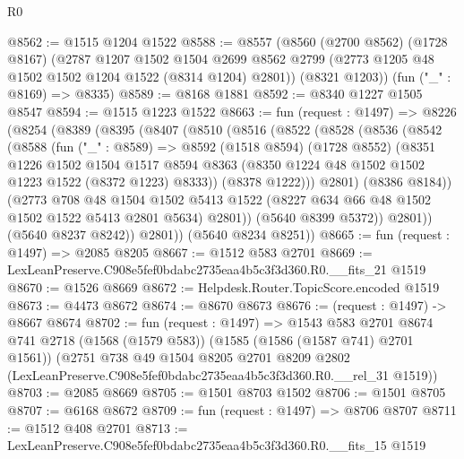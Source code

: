 \begin{lexlean}{R0}
\begin{coremodule}
@8562 := @1515 @1204 @1522
@8588 := @8557
    (@8560
      (@2700 @8562)
      (@1728 @8167)
      (@2787
        @1207
        @1502
        @1504
        @2699
        @8562
        @2799
        (@2773 @1205 @48 @1502 @1502 @1204 @1522 (@8314 @1204) @2801))
      (@8321 @1203))
    (fun ("_" : @8169) => @8335)
@8589 := @8168 @1881
@8592 := @8340 @1227 @1505 @8547
@8594 := @1515 @1223 @1522
@8663 := fun (request : @1497) =>
  @8226
    (@8254
      (@8389
        (@8395
          (@8407
            (@8510
              (@8516
                (@8522
                  (@8528
                    (@8536
                      (@8542
                        (@8588
                          (fun ("_" : @8589) =>
                          @8592
                            (@1518 @8594)
                            (@1728 @8552)
                            (@8351
                              @1226
                              @1502
                              @1504
                              @1517
                              @8594
                              @8363
                              (@8350 @1224 @48 @1502 @1502 @1223 @1522 (@8372 @1223) @8333))
                            (@8378 @1222)))
                        @2801)
                      (@8386 @8184))
                    (@2773
                      @708
                      @48
                      @1504
                      @1502
                      @5413
                      @1522
                      (@8227 @634 @66 @48 @1502 @1502 @1522 @5413 @2801 @5634)
                      @2801))
                  (@5640 @8399 @5372))
                @2801))
            (@5640 @8237 @8242))
          @2801))
      (@5640 @8234 @8251))
@8665 := fun (request : @1497) => @2085 @8205
@8667 := @1512 @583 @2701
@8669 := LexLeanPreserve.C908e5fef0bdabc2735eaa4b5c3f3d360.R0.__fits_21 @1519
@8670 := @1526 @8669
@8672 := Helpdesk.Router.TopicScore.encoded @1519
@8673 := @4473 @8672
@8674 := @8670 @8673
@8676 := (request : @1497) -> @8667 @8674
@8702 := fun (request : @1497) =>
  @1543
    @583
    @2701
    @8674
    @741
    @2718
    (@1568 (@1579 @583))
    (@1585 (@1586 (@1587 @741) @2701 @1561))
    (@2751
      @738
      @49
      @1504
      @8205
      @2701
      @8209
      @2802
      (LexLeanPreserve.C908e5fef0bdabc2735eaa4b5c3f3d360.R0.__rel_31 @1519))
@8703 := @2085 @8669
@8705 := @1501 @8703 @1502
@8706 := @1501 @8705
@8707 := @6168 @8672
@8709 := fun (request : @1497) => @8706 @8707
@8711 := @1512 @408 @2701
@8713 := LexLeanPreserve.C908e5fef0bdabc2735eaa4b5c3f3d360.R0.__fits_15 @1519

\end{coremodule}
\end{lexlean}
